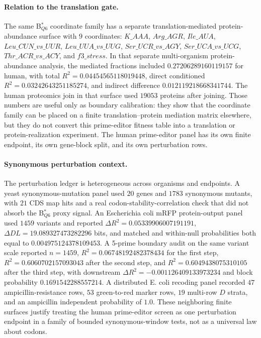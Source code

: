 \paragraph{Relation to the translation gate.}
The same B$^*_{Q6}$ coordinate family has a separate translation-mediated protein-abundance surface with $9$ coordinates: $K\_AAA$, $Arg\_AGR$, $Ile\_AUA$, $Leu\_CUN\_vs\_UUR$, $Leu\_UUA\_vs\_UUG$, $Ser\_UCR\_vs\_AGY$, $Ser\_UCA\_vs\_UCG$, $Thr\_ACR\_vs\_ACY$, and $f3\_stress$. In that separate multi-organism protein-abundance analysis, the mediated fractions included $0.27206289160119157$ for human, with total $R^2=0.04454565118019448$, direct conditioned $R^2=0.03242643251185274$, and indirect difference $0.012119218668341744$. The human proteomics join in that surface used $19053$ proteins after joining. Those numbers are useful only as boundary calibration: they show that the coordinate family can be placed on a finite translation--protein mediation matrix elsewhere, but they do not convert this prime-editor fitness table into a translation or protein-realization experiment. The human prime-editor panel has its own finite endpoint, its own gene-block split, and its own perturbation rows.

\paragraph{Synonymous perturbation context.}
The perturbation ledger is heterogeneous across organisms and endpoints. A yeast synonymous-mutation panel used $20$ genes and $1783$ synonymous mutants, with $21$ CDS map hits and a real codon-stability-correlation check that did not absorb the B$^*_{Q6}$ proxy signal. An Escherichia coli mRFP protein-output panel used $1459$ variants and reported $\Delta R^2=0.05339906007191191$, $\Delta DL=19.089327473282296$ bits, and matched and within-null probabilities both equal to $0.004975124378109453$. A 5-prime boundary audit on the same variant scale reported $n=1459$, $R^2=0.06748192482378434$ for the first step, $R^2=0.6060702157093043$ after the second step, and $R^2=0.6049438075310105$ after the third step, with downstream $\Delta R^2=-0.001126409133973234$ and block probability $0.1691542288557214$. A distributed E. coli recoding panel recorded $47$ ampicillin-resistance rows, $53$ green-to-red marker rows, $19$ multi-row $D$ strata, and an ampicillin independent probability of $1.0$. These neighboring finite surfaces justify treating the human prime-editor screen as one perturbation endpoint in a family of bounded synonymous-window tests, not as a universal law about codons.

